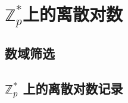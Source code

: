 \section{$\mathbb{Z}_p^*$上的离散对数}\label{sec:17-3}

\subsection{数域筛选}\label{subsec:17-3-1}

\subsection{$\mathbb{Z}_p^*$ 上的离散对数记录}\label{subsec:17-3-2}